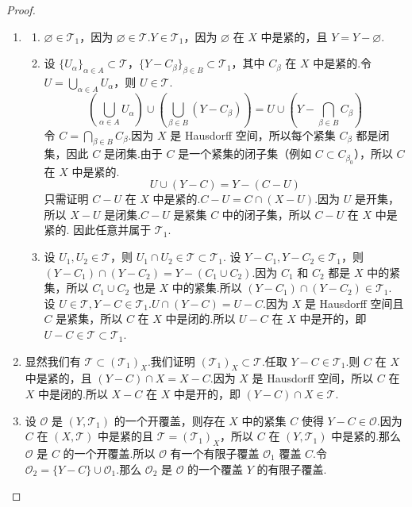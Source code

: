 \begin{proof}
    \begin{enumerate}
        \item[(1)]
        \begin{enumerate}
            \item[(i)] $\varnothing \in \mathcal{T}_1$，因为 $\varnothing \in \mathcal{T}$.$Y \in \mathcal{T}_1$，因为 $\varnothing$ 在 $X$ 中是紧的，且 $Y = Y - \varnothing$.
            \item[(ii)] 设 $\{U_\alpha\}_{\alpha \in A} \subset \mathcal{T}$，$\{Y-C_\beta\}_{\beta \in B} \subset \mathcal{T}_1$，其中 $C_\beta$ 在 $X$ 中是紧的.令 $U = \bigcup_{\alpha \in A} U_\alpha$，则 $U \in \mathcal{T}$.
            \[ \left( \bigcup_{\alpha \in A} U_\alpha \right) \cup \left( \bigcup_{\beta \in B} (Y-C_\beta) \right) = U \cup (Y - \bigcap_{\beta \in B} C_\beta) \]
            令 $C = \bigcap_{\beta \in B} C_\beta$.因为 $X$ 是 Hausdorff 空间，所以每个紧集 $C_\beta$ 都是闭集，因此 $C$ 是闭集.由于 $C$ 是一个紧集的闭子集（例如 $C \subset C_{\beta_0}$），所以 $C$ 在 $X$ 中是紧的.
            \[ U \cup (Y-C) = Y - (C-U) \]
            只需证明 $C-U$ 在 $X$ 中是紧的.$C-U = C \cap (X-U)$.因为 $U$ 是开集，所以 $X-U$ 是闭集.$C-U$ 是紧集 $C$ 中的闭子集，所以 $C-U$ 在 $X$ 中是紧的.
            因此任意并属于 $\mathcal{T}_1$.
            \item[(iii)] 设 $U_1, U_2 \in \mathcal{T}$，则 $U_1 \cap U_2 \in \mathcal{T} \subset \mathcal{T}_1$.
            设 $Y-C_1, Y-C_2 \in \mathcal{T}_1$，则 $(Y-C_1) \cap (Y-C_2) = Y - (C_1 \cup C_2)$.因为 $C_1$ 和 $C_2$ 都是 $X$ 中的紧集，所以 $C_1 \cup C_2$ 也是 $X$ 中的紧集.所以 $(Y-C_1) \cap (Y-C_2) \in \mathcal{T}_1$.
            设 $U \in \mathcal{T}, Y-C \in \mathcal{T}_1$.$U \cap (Y-C) = U-C$.因为 $X$ 是 Hausdorff 空间且 $C$ 是紧集，所以 $C$ 在 $X$ 中是闭的.所以 $U-C$ 在 $X$ 中是开的，即 $U-C \in \mathcal{T} \subset \mathcal{T}_1$.
        \end{enumerate}
        \item[(2)] 显然我们有 $\mathcal{T} \subset (\mathcal{T}_1)_X$.我们证明 $(\mathcal{T}_1)_X \subset \mathcal{T}$.任取 $Y-C \in \mathcal{T}_1$.则 $C$ 在 $X$ 中是紧的，且 $(Y-C) \cap X = X-C$.因为 $X$ 是 Hausdorff 空间，所以 $C$ 在 $X$ 中是闭的.所以 $X-C$ 在 $X$ 中是开的，即 $(Y-C) \cap X \in \mathcal{T}$.
        \item[(3)] 设 $\mathcal{O}$ 是 $(Y, \mathcal{T}_1)$ 的一个开覆盖，则存在 $X$ 中的紧集 $C$ 使得 $Y-C \in \mathcal{O}$.因为 $C$ 在 $(X, \mathcal{T})$ 中是紧的且 $\mathcal{T} = (\mathcal{T}_1)_X$，所以 $C$ 在 $(Y, \mathcal{T}_1)$ 中是紧的.那么 $\mathcal{O}$ 是 $C$ 的一个开覆盖.所以 $\mathcal{O}$ 有一个有限子覆盖 $\mathcal{O}_1$ 覆盖 $C$.令 $\mathcal{O}_2 = \{Y-C\} \cup \mathcal{O}_1$.那么 $\mathcal{O}_2$ 是 $\mathcal{O}$ 的一个覆盖 $Y$ 的有限子覆盖.

\end{enumerate}
\end{proof}
